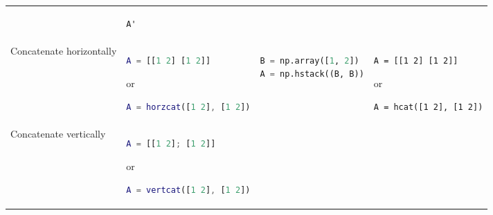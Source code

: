 \documentclass[10pt, landscape]{article}
\begin{document}
\begin{multicols}{2}
\begin{tabular}[]{@{}llll@{}}
\begin{minipage}[t]{0.20\columnwidth}
\end{minipage} & \begin{minipage}[t]{0.20\columnwidth}\raggedright
\begin{lstlisting}
A'
\end{lstlisting}

\end{minipage}\tabularnewline
\begin{minipage}[t]{0.24\columnwidth}\raggedright
Concatenate horizontally
\end{minipage} & \begin{minipage}[t]{0.23\columnwidth}\raggedright
\begin{lstlisting}[language=Matlab]
A = [[1 2] [1 2]]
\end{lstlisting}

or

\begin{lstlisting}[language=Matlab]
A = horzcat([1 2], [1 2])
\end{lstlisting}

\end{minipage} & \begin{minipage}[t]{0.20\columnwidth}\raggedright
\begin{lstlisting}[language=Python]
B = np.array([1, 2])
A = np.hstack((B, B))
\end{lstlisting}

\end{minipage} & \begin{minipage}[t]{0.20\columnwidth}\raggedright
\begin{lstlisting}
A = [[1 2] [1 2]]
\end{lstlisting}

or

\begin{lstlisting}
A = hcat([1 2], [1 2])
\end{lstlisting}

\end{minipage}\tabularnewline
\begin{minipage}[t]{0.24\columnwidth}\raggedright
Concatenate vertically
\end{minipage} & \begin{minipage}[t]{0.23\columnwidth}\raggedright
\begin{lstlisting}[language=Matlab]
A = [[1 2]; [1 2]]
\end{lstlisting}

or

\begin{lstlisting}[language=Matlab]
A = vertcat([1 2], [1 2])
\end{lstlisting}


\end{minipage}
\end{tabular}
\end{multicols}
\end{document}

